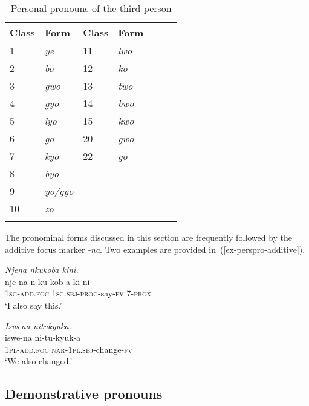 \begin{table}
\caption{Personal pronouns of the third person}
\begin{tabular}{l l l l l l l }
\lsptoprule
 Class & Form & Class & Form\\
\midrule
1 & \textit{ye}   &     11 & \textit{lwo}\\
2 & \textit{bo}   &     12 & \textit{ko}\\
3 & \textit{gwo}  &     13 & \textit{two}\\
4 & \textit{gyo}  &     14 & \textit{bwo}\\
5 & \textit{lyo}  &     15 & \textit{kwo}\\
6 & \textit{go}   &      20 & \textit{gwo}\\
7 & \textit{kyo}  &     22 & \textit{go}\\
8 & \textit{byo}\\
9 & \textit{yo/gyo}\\
10 & \textit{zo}\\
\lspbottomrule
\end{tabular}
\label{tab-perspro-3}
\end{table}



The pronominal forms discussed in this section are frequently followed by the additive focus marker \textit{-na}. 
Two examples are provided in~(\ref{ex-perspro-additive}).

\ea \label{ex-perspro-additive}
\begin{xlist}	
 
    \ex  \label{ex-perspro-additive-a}
    \textit{Njena nkukoba kini.}\\
    \gll    nje-na n-ku-kob-a ki-ni\\
	1\textsc{sg}-\textsc{add.foc} \textsc{1sg.sbj}-\textsc{prog}-say-\textsc{fv} 7-\textsc{prox}\\
    \glt  ‘I also say this.’
    
    \ex  \label{ex-perspro-additive-b}
    \textit{Iswena nitukyuka.}\\
    \gll     iswe-na ni-tu-kyuk-a\\
	1\textsc{pl}-\textsc{add.foc} \textsc{nar}-\textsc{1pl.sbj}-change-\textsc{fv}\\
    \glt  `We also changed.’
\end{xlist}	
\z


\subsection{Demonstrative pronouns}\label{sec-morph-demonstrpro}


